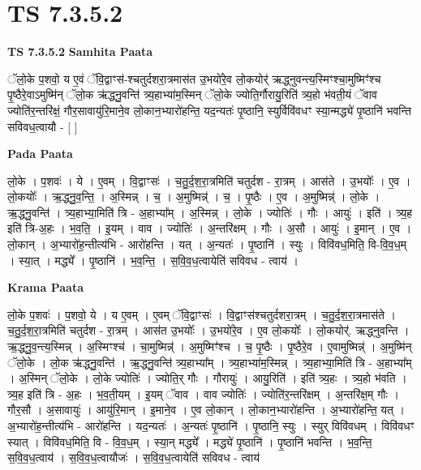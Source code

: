 \documentclass[17pt]{extarticle}
\begin{document}
\section{ TS 7.3.5.2 }

\textbf{TS 7.3.5.2 } \newline
\textbf{Samhita Paata} \newline

ॅलो॒के प॒शवो॒ य ए॒वं ॅवि॒द्वाꣳस॑-श्चतुर्दशरा॒त्रमास॑त उ॒भयो॑रे॒व लो॒कयोर्॑ ऋद्ध्नुवन्त्य॒स्मिꣳश्चा॒मुष्मिꣳ॑श्च पृ॒ष्ठैरे॒वाऽमुष्मि॑न् ॅलो॒क ऋ॑द्ध्नु॒वन्ति॑ त्र्य॒हाभ्या॑म॒स्मिन् ॅलो॒के ज्योति॒र्गौरायु॒रिति॑ त्र्य॒हो भ॑वती॒यं ॅवाव ज्योति॑र॒न्तरि॑क्षं॒ गौर॒सावायु॑रि॒माने॒व लो॒कान॒भ्यारो॑हन्ति॒ यद॒न्यतः॑ पृ॒ष्ठानि॒ स्युर्विवि॑वधꣳ स्या॒न्मद्ध्ये॑ पृ॒ष्ठानि॑ भवन्ति सविवध॒त्वायौ - [  ] \newline

\textbf{Pada Paata} \newline

लो॒के । प॒शवः॑ । ये । ए॒वम् । वि॒द्वाꣳसः॑ । च॒तु॒र्द॒श॒रा॒त्रमिति॑ चतुर्दश - रा॒त्रम् । आस॑ते । उ॒भयोः᳚ । ए॒व । लो॒कयोः᳚ । ऋ॒द्ध्नु॒व॒न्ति॒ । अ॒स्मिन्न् । च॒ । अ॒मुष्मिन्न्॑ । च॒ । पृ॒ष्ठैः । ए॒व । अ॒मुष्मिन्न्॑ । लो॒के । ऋ॒द्ध्नु॒वन्ति॑ । त्र्य॒हाभ्या॒मिति॑ त्रि - अ॒हाभ्या᳚म् । अ॒स्मिन्न् । लो॒के । ज्योतिः॑ । गौः । आयुः॑ । इति॑ । त्र्य॒ह इति॑ त्रि-अ॒हः । भ॒व॒ति॒ । इ॒यम् । वाव । ज्योतिः॑ । अ॒न्तरि॑क्षम् । गौः । अ॒सौ । आयुः॑ । इ॒मान् । ए॒व । लो॒कान् । अ॒भ्यारो॑ह॒न्तीत्य॑भि - आरो॑हन्ति । यत् । अ॒न्यतः॑ । पृ॒ष्ठानि॑ । स्युः । विवि॑वध॒मिति॒ वि-वि॒व॒ध॒म् । स्या॒त् । मद्ध्ये᳚ । पृ॒ष्ठानि॑ । भ॒व॒न्ति॒ । स॒वि॒व॒ध॒त्वायेति॑ सविवध - त्वाय॑ ।  \newline


\textbf{Krama Paata} \newline

लो॒के प॒शवः॑ । प॒शवो॒ ये । य ए॒वम् । ए॒वम् ॅवि॒द्वाꣳसः॑ । वि॒द्वाꣳस॑श्चतुर्दशरा॒त्रम् । च॒तु॒र्द॒श॒रा॒त्रमास॑ते । च॒तु॒र्द॒श॒रा॒त्रमिति॑ चतुर्दश - रा॒त्रम् । आस॑त उ॒भयोः᳚ । उ॒भयो॑रे॒व । ए॒व लो॒कयोः᳚ । लो॒कयोर्॑. ऋद्ध्नुवन्ति । ऋ॒द्ध्नु॒व॒न्त्य॒स्मिन्न् । अ॒स्मिꣳश्च॑ । चा॒मुष्मिन्न्॑ । अ॒मुष्मिꣳ॑श्च । च॒ पृ॒ष्ठैः । पृ॒ष्ठैरे॒व । ए॒वामुष्मिन्न्॑ । अ॒मुष्मि॑न् ॅलो॒के । लो॒क ऋ॑द्ध्नु॒वन्ति॑ । ऋ॒द्ध्नु॒वन्ति॑ त्र्य॒हाभ्या᳚म् । त्र्य॒हाभ्या॑म॒स्मिन्न् । त्र्य॒हाभ्या॒मिति॑ त्रि - अ॒हाभ्या᳚म् । अ॒स्मिन् ॅलो॒के । लो॒के ज्योतिः॑ । ज्योति॒र् गौः । गौरायुः॑ । आयु॒रिति॑ । इति॑ त्र्य॒हः । त्र्य॒हो भ॑वति । त्र्य॒ह इति॑ त्रि - अ॒हः । भ॒व॒ती॒यम् । इ॒यम् ॅवाव । वाव ज्योतिः॑ । ज्योति॑र॒न्तरि॑क्षम् । अ॒न्तरि॑क्ष॒म् गौः । गौर॒सौ । अ॒सावायुः॑ । आयु॑रि॒मान् । इ॒माने॒व । ए॒व लो॒कान् । लो॒कान॒भ्यारो॑हन्ति । अ॒भ्यारो॑हन्ति॒ यत् । अ॒भ्यारो॑ह॒न्तीत्य॑भि - आरो॑हन्ति । यद॒न्यतः॑ । अ॒न्यतः॑ पृ॒ष्ठानि॑ । पृ॒ष्ठानि॒ स्युः । स्युर् विवि॑वधम् । विवि॑वधꣳ स्यात् । विवि॑वध॒मिति॒ वि - वि॒व॒ध॒म् । स्या॒न् मद्ध्ये᳚ । मद्ध्ये॑ पृ॒ष्ठानि॑ । पृ॒ष्ठानि॑ भवन्ति । भ॒व॒न्ति॒ स॒वि॒व॒ध॒त्वाय॑ । स॒वि॒व॒ध॒त्वायौजः॑ । स॒वि॒व॒ध॒त्वायेति॑ सविवध - त्वाय॑ \newline
\end{document}
